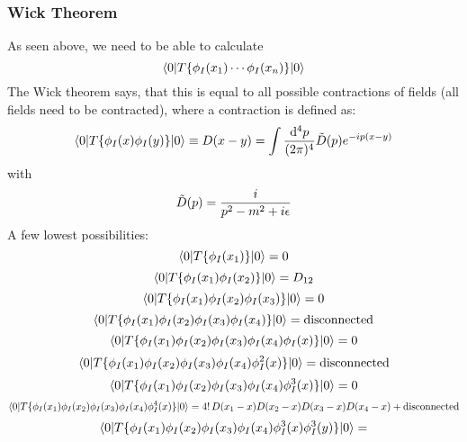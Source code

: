 \subsubsection{Wick Theorem}

As seen above, we need to be able to calculate 
\begin{equation*}
  \mathinner{\langle{0|T\{\phi_I(x_1)\cdots\phi_I(x_n)\}|0}\rangle}
\end{equation*}
The Wick theorem says, that this is equal to all possible contractions of fields (all fields need to be contracted), where a contraction is defined as: 
\begin{equation*}
  \mathinner{\langle{0|T\{\phi_I(x)\phi_I(y)\}|0}\rangle}\equiv D(x-y)= \int {{\rm d}^4 p\over (2\pi)^4}\tilde D(p) e^{-ip(x-y)}
\end{equation*}
with 
\begin{equation*}
  \tilde D(p) = {i\over p^2-m^2+i\epsilon}
\end{equation*}
A few lowest possibilities: 
\begin{equation*}
  \mathinner{\langle{0|T\{\phi_I(x_1)\}|0}\rangle}= 0
\end{equation*}
\begin{equation*}
  \mathinner{\langle{0|T\{\phi_I(x_1)\phi_I(x_2)\}|0}\rangle}= D_{12}
\end{equation*}
\begin{equation*}
  \mathinner{\langle{0|T\{\phi_I(x_1)\phi_I(x_2)\phi_I(x_3)\}|0}\rangle}= 0
\end{equation*}
\begin{equation*}
  \mathinner{\langle{0|T\{\phi_I(x_1)\phi_I(x_2)\phi_I(x_3)\phi_I(x_4)\}|0}\rangle}= \hbox{disconnected}
\end{equation*}
\begin{equation*}
  \mathinner{\langle{0|T\{\phi_I(x_1)\phi_I(x_2)\phi_I(x_3)\phi_I(x_4)\phi_I(x)\}|0}\rangle}= 0
\end{equation*}
\begin{equation*}
  \mathinner{\langle{0|T\{\phi_I(x_1)\phi_I(x_2)\phi_I(x_3)\phi_I(x_4)\phi_I^2(x)\}|0}\rangle}= \hbox{disconnected}
\end{equation*}
\begin{equation*}
  \mathinner{\langle{0|T\{\phi_I(x_1)\phi_I(x_2)\phi_I(x_3)\phi_I(x_4)\phi_I^3(x)\}|0}\rangle}= 0
\end{equation*}
\begin{equation*}
  \mathinner{\langle{0|T\{\phi_I(x_1)\phi_I(x_2)\phi_I(x_3)\phi_I(x_4)\phi_I^4(x)\}|0}\rangle}= 4!\,D(x_1-x)D(x_2-x)D(x_3-x)D(x_4-x)+\hbox{disconnected}
\end{equation*}
\begin{equation*}
  \mathinner{\langle{0|T\{\phi_I(x_1)\phi_I(x_2)\phi_I(x_3)\phi_I(x_4)\phi_I^3(x)\phi_I^3(y)\}|0}\rangle}=
\end{equation*}
